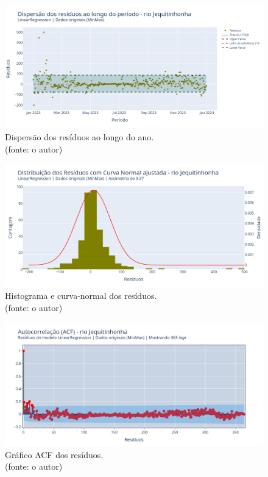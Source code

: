 \begin{figure}[!h]
	\centering
	\includegraphics[scale=0.33]{Figuras/jequiti/wfv/LR/LR_WFV_ORIG_RESID_x_TEMPO.png}
	\caption{Dispersão dos resíduos ao longo do ano.\\(fonte: o autor)}
	\label{fig:jequiti_LR_WFV_ORIG_RESID_x_TEMPO}
\end{figure}

\begin{figure}[!h]
	\centering
	\includegraphics[scale=0.33]{Figuras/jequiti/wfv/LR/LR_WFV_ORIG_RESID_x_CURVA_NORMAL.png}
	\caption{Histograma e curva-normal dos resíduos.\\(fonte: o autor)}
	\label{fig:jequiti_LR_WFV_ORIG_RESID_x_CURVA_NORMAL}
\end{figure}

\begin{figure}[!h]
	\centering
	\includegraphics[scale=0.33]{Figuras/jequiti/wfv/LR/LR_WFV_ORIG_RESID_ACF.png}
	\caption{Gráfico ACF dos resíduos.\\(fonte: o autor)}
	\label{fig:jequiti_LR_WFV_ORIG_RESID_ACF}
\end{figure}
\clearpage

